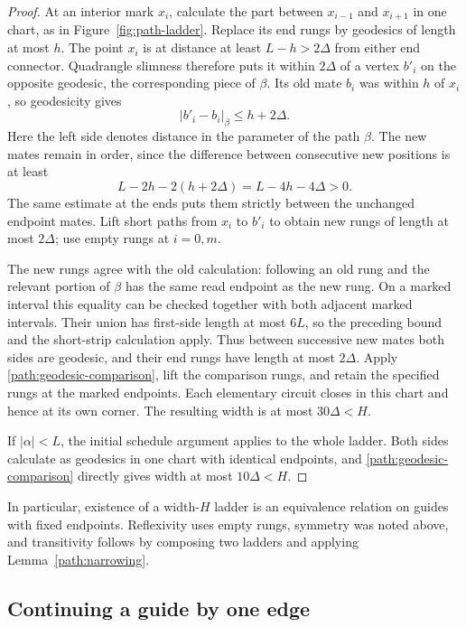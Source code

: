 \documentclass[11pt,reqno]{amsart}
\numberwithin{equation}{section}
\theoremstyle{definition}
\theoremstyle{remark}
\begin{document}
\begin{proof}
At an interior mark $x_i$, calculate the part between $x_{i-1}$ and
$x_{i+1}$ in one chart, as in Figure~\ref{fig:path-ladder}.
Replace its end rungs by geodesics of length at
most $h$.  The point $x_i$ is at distance at least $L-h>2\Delta$ from
either end connector.  Quadrangle slimness therefore puts it within
$2\Delta$ of a vertex $b'_i$ on the opposite geodesic, the corresponding
piece of $\beta$.  Its old mate $b_i$ was within $h$ of $x_i$, so
geodesicity gives
\begin{equation}\label{path:mate-shift}
 |b'_i-b_i|_{\beta}\le h+2\Delta.
\end{equation}
Here the left side denotes distance in the parameter of the path
$\beta$.  The new mates remain in order, since the difference between
consecutive new positions is at least
\[
 L-2h-2(h+2\Delta)=L-4h-4\Delta>0.
\]
The same estimate at the ends puts them strictly between the unchanged
endpoint mates.  Lift short paths from $x_i$ to $b'_i$ to obtain new
rungs of length at most $2\Delta$; use empty rungs at $i=0,m$.

The new rungs agree with the old calculation: following an old rung and
the relevant portion of $\beta$ has the same read endpoint as the new
rung.  On a marked interval this equality can be checked together with
both adjacent marked intervals.  Their union has first-side length at
most $6L$, so the preceding bound and the short-strip calculation apply.
Thus between successive new mates both sides are geodesic, and their
end rungs have length at most $2\Delta$.  Apply
\eqref{path:geodesic-comparison}, lift the comparison rungs, and retain
the specified rungs at the marked endpoints.  Each elementary circuit
closes in this chart and hence at its own corner.  The resulting width
is at most $30\Delta<H$.

If $|\alpha|<L$, the initial schedule argument applies to the whole
ladder.  Both sides calculate as geodesics in one chart with identical
endpoints, and \eqref{path:geodesic-comparison} directly gives width at
most $10\Delta<H$.
\end{proof}

In particular, existence of a width-$H$ ladder is an equivalence relation
on guides with fixed endpoints.  Reflexivity uses empty rungs, symmetry
was noted above, and transitivity follows by composing two ladders and
applying Lemma~\ref{path:narrowing}.

\subsection{Continuing a guide by one edge}
\end{document}
